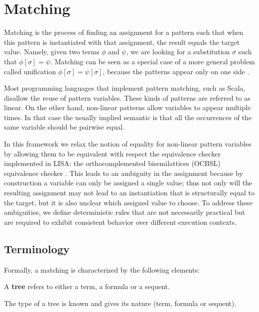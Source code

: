 \section{Matching}
\label{sec:matching}

Matching is the process of finding an assignment for a pattern such that when this pattern is instantiated with that assignment, the result equals the target value. Namely, given two terms $\phi$ and $\psi$, we are looking for a substitution $\sigma$ such that $\phi[\sigma] = \psi$. Matching can be seen as a special case of a more general problem called unification $\phi[\sigma] = \psi[\sigma]$, because the patterns appear only on one side \cite{Knight1989}.

Most programming languages that implement pattern matching, such as Scala, disallow the reuse of pattern variables. These kinds of patterns are referred to as linear. On the other hand, non-linear patterns allow variables to appear multiple times. In that case the usually implied semantic is that all the occurrences of the same variable should be pairwise equal.

In this framework we relax the notion of equality for non-linear pattern variables by allowing them to be equivalent with respect the equivalence checker implemented in LISA: the orthocomplemented bisemilattices (OCBSL) equivalence checker \cite{Guilloud2022}. This leads to an ambiguity in the assignment because by construction a variable can only be assigned a single value; thus not only will the resulting assignment may not lead to an instantiation that is structurally equal to the target, but it is also unclear which assigned value to choose. To address these ambiguities, we define deterministic rules that are not necessarily practical but are required to exhibit consistent behavior over different execution contexts.

\subsection{Terminology}

Formally, a matching is characterized by the following elements:

\begin{definition}[Tree]
A \textbf{tree} refers to either a term, a formula or a sequent.
\end{definition}

The type of a tree is known and gives its nature (term, formula or sequent).

